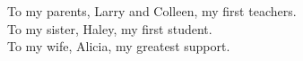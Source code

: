 To my parents, Larry and Colleen, my first teachers.\\
To my sister, Haley, my first student.\\
To my wife, Alicia, my greatest support.